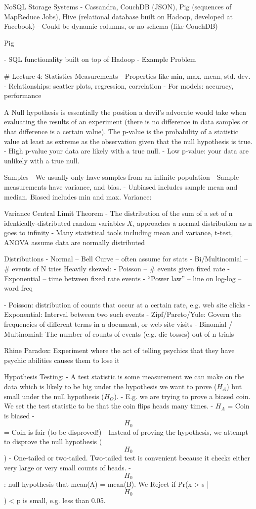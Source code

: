 \documentclass[3pt,landscape]{article}
\begin{document}
\begin{multicols}{3}
NoSQL Storage Systems
- Cassandra, CouchDB (JSON), Pig (sequences of MapReduce Jobs), Hive (relational database built on Hadoop, developed at Facebook)
- Could be dynamic columns, or no schema (like CouchDB)

Pig 

- SQL functionality built on top of Hadoop
- Example Problem

 
\# Lecture 4: Statistics
Measurements
- Properties like min, max, mean, std. dev.
- Relationships: scatter plots, regression, correlation
- For models: accuracy, performance

A Null hypothesis is essentially the position a devil’s advocate would take when evaluating the results of an experiment (there is no difference in data samples or that difference is a certain value).
The p-value is the probability of a statistic value at least as extreme as the observation given that the null hypothesis is true.
- High p-value your data are likely with a true null.
- Low p-value: your data are unlikely with a true null.

Samples
- We usually only have samples from an infinite population
- Sample measurements have variance, and bias.
- Unbiased includes sample mean and median. Biased includes min and max. Variance:

Variance 
Central Limit Theorem
- The distribution of the sum of a set of n identically-distributed random variables $X_i$ approaches a normal distribution as n goes to infinity
- Many statistical tools including mean and variance, t-test, ANOVA assume data are normally distributed

Distributions
- Normal -- Bell Curve -- often assume for stats
- Bi/Multinomial -- \# events of N tries
Heavily skewed:
- Poisson -- \# events given fixed rate
- Exponential -- time between fixed rate events
- “Power law” -- line on log-log -- word freq

- Poisson: distribution of counts that occur at a certain rate, e.g. web site clicks
- Exponential: Interval between two such events
- Zipf/Pareto/Yule: Govern the frequencies of different terms in a document, or web site visits
- Binomial / Multinomial: The number of counts of events (e.g. die tosses) out of n trials

Rhine Paradox: Experiment where the act of telling psychics that they have psychic abilities causes them to lose it

Hypothesis Testing:
- A test statistic is some measurement we can make on the data which is likely to be big under the hypothesis we want to prove ($H_A$) but small under the null hypothesis ($H_O$).
- E.g. we are trying to prove a biased coin. We set the test statistic to be that the coin flips heads many times. 
  - $H_A$ = Coin is biased
  - $$H_0$$ = Coin is fair (to be disproved!)
- Instead of proving the hypothesis, we attempt to disprove the null hypothesis ($$H_0$$)
- One-tailed or two-tailed. Two-tailed test is convenient because it checks either very large or very small counts of heads.
- $$H_0$$: null hypothesis that mean(A) = mean(B). We Reject if Pr(x > s | $$H_0$$) < p is small, e.g. less than 0.05.


\end{multicols}
\end{document}
